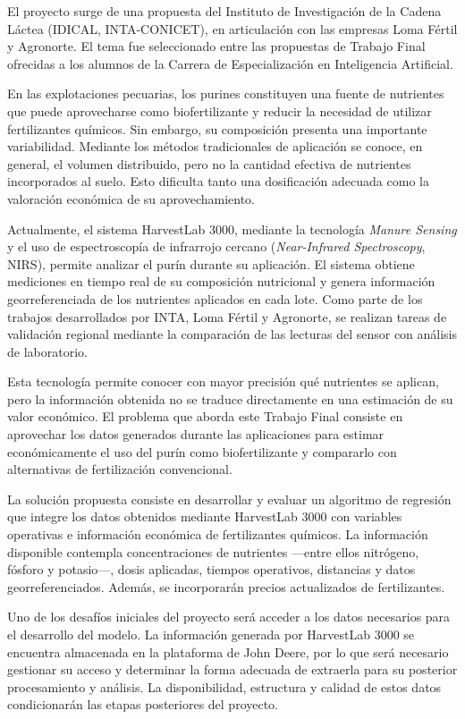 \documentclass[
11pt, %
]{charter}
\begin{document}
El proyecto surge de una propuesta del Instituto de Investigación de la Cadena Láctea (IDICAL, INTA-CONICET), en articulación con las empresas Loma Fértil y Agronorte. El tema fue seleccionado entre las propuestas de Trabajo Final ofrecidas a los alumnos de la Carrera de Especialización en Inteligencia Artificial.

En las explotaciones pecuarias, los purines constituyen una fuente de nutrientes que puede aprovecharse como biofertilizante y reducir la necesidad de utilizar fertilizantes químicos. Sin embargo, su composición presenta una importante variabilidad. Mediante los métodos tradicionales de aplicación se conoce, en general, el volumen distribuido, pero no la cantidad efectiva de nutrientes incorporados al suelo. Esto dificulta tanto una dosificación adecuada como la valoración económica de su aprovechamiento.

Actualmente, el sistema HarvestLab 3000, mediante la tecnología \textit{Manure Sensing} y el uso de espectroscopía de infrarrojo cercano (\textit{Near-Infrared Spectroscopy}, NIRS), permite analizar el purín durante su aplicación. El sistema obtiene mediciones en tiempo real de su composición nutricional y genera información georreferenciada de los nutrientes aplicados en cada lote. Como parte de los trabajos desarrollados por INTA, Loma Fértil y Agronorte, se realizan tareas de validación regional mediante la comparación de las lecturas del sensor con análisis de laboratorio.

Esta tecnología permite conocer con mayor precisión qué nutrientes se aplican, pero la información obtenida no se traduce directamente en una estimación de su valor económico. El problema que aborda este Trabajo Final consiste en aprovechar los datos generados durante las aplicaciones para estimar económicamente el uso del purín como biofertilizante y compararlo con alternativas de fertilización convencional.

La solución propuesta consiste en desarrollar y evaluar un algoritmo de regresión que integre los datos obtenidos mediante HarvestLab 3000 con variables operativas e información económica de fertilizantes químicos. La información disponible contempla concentraciones de nutrientes —entre ellos nitrógeno, fósforo y potasio—, dosis aplicadas, tiempos operativos, distancias y datos georreferenciados. Además, se incorporarán precios actualizados de fertilizantes.

Uno de los desafíos iniciales del proyecto será acceder a los datos necesarios para el desarrollo del modelo. La información generada por HarvestLab 3000 se encuentra almacenada en la plataforma de John Deere, por lo que será necesario gestionar su acceso y determinar la forma adecuada de extraerla para su posterior procesamiento y análisis. La disponibilidad, estructura y calidad de estos datos condicionarán las etapas posteriores del proyecto.
\end{document}
